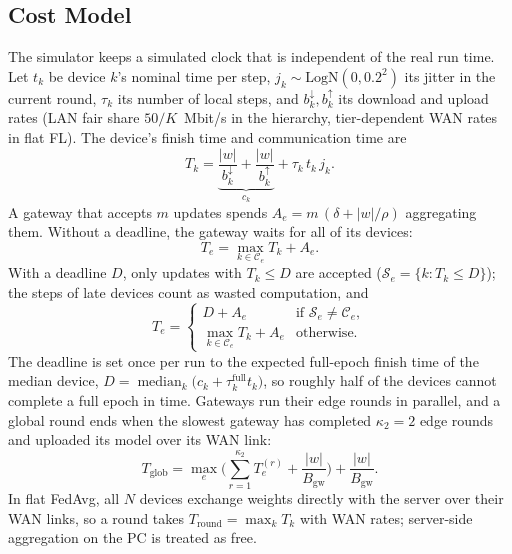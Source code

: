 \documentclass[conference]{IEEEtran}
\newcommand{\wsize}{|w|}
\begin{document}
\subsection{Cost Model}
\label{sec:cost}
The simulator keeps a simulated clock that is independent of the real run time. Let $t_k$ be device $k$'s nominal time per step, $j_k \sim \mathrm{LogN}(0, 0.2^2)$ its jitter in the current round, $\tau_k$ its number of local steps, and $b_k^{\downarrow}, b_k^{\uparrow}$ its download and upload rates (LAN fair share $50/K$~Mbit/s in the hierarchy, tier-dependent WAN rates in flat FL). The device's finish time and communication time are
\begin{equation}
T_k = \underbrace{\frac{\wsize}{b_k^{\downarrow}} + \frac{\wsize}{b_k^{\uparrow}}}_{c_k} + \tau_k\, t_k\, j_k .
\label{eq:tk}
\end{equation}
A gateway that accepts $m$ updates spends $A_e = m\,(\delta + \wsize/\rho)$ aggregating them. Without a deadline, the gateway waits for all of its devices:
\begin{equation}
T_e = \max_{k \in \mathcal{C}_e} T_k + A_e .
\label{eq:sync}
\end{equation}
With a deadline $D$, only updates with $T_k \le D$ are accepted ($\mathcal{S}_e = \{k : T_k \le D\}$); the steps of late devices count as wasted computation, and
\begin{equation}
T_e = \begin{cases} D + A_e & \text{if } \mathcal{S}_e \neq \mathcal{C}_e,\\ \max_{k \in \mathcal{C}_e} T_k + A_e & \text{otherwise.} \end{cases}
\label{eq:deadline}
\end{equation}
The deadline is set once per run to the expected full-epoch finish time of the median device, $D = \operatorname{median}_k \big(c_k + \tau_k^{\mathrm{full}} t_k\big)$, so roughly half of the devices cannot complete a full epoch in time. Gateways run their edge rounds in parallel, and a global round ends when the slowest gateway has completed $\kappa_2 = 2$ edge rounds and uploaded its model over its WAN link:
\begin{equation}
T_{\mathrm{glob}} = \max_{e} \Big( \sum_{r=1}^{\kappa_2} T_e^{(r)} + \frac{\wsize}{B_{\mathrm{gw}}} \Big) + \frac{\wsize}{B_{\mathrm{gw}}} .
\label{eq:global}
\end{equation}
In flat FedAvg, all $N$ devices exchange weights directly with the server over their WAN links, so a round takes $T_{\mathrm{round}} = \max_k T_k$ with WAN rates; server-side aggregation on the PC is treated as free.
\end{document}
